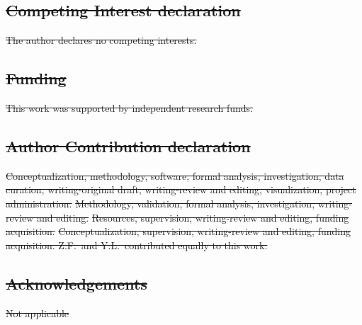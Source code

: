 \documentclass[referee, pdflatex, sn-vancouver-num]{sn-jnl}
\providecommand{\DIFdeltex}[1]{{\protect\color{red}\sout{#1}}}                      %
\providecommand{\DIFaddbegin}{} %
\providecommand{\DIFaddend}{} %
\providecommand{\DIFdelbegin}{} %
\providecommand{\DIFdelend}{} %
\providecommand{\DIFdel}[1]{\texorpdfstring{\DIFdeltex{#1}}{}} %
\newcommand{\DIFscaledelfig}{0.5}
\newlength{\DIFdelgraphicswidth} %
\newlength{\DIFdelgraphicsheight} %
\newcommand{\DIFaddincludegraphics}[2][]{{\color{blue}\fbox{\DIFOincludegraphics[#1]{#2}}}} %
\newcommand{\DIFdelincludegraphics}[2][]{%
\sbox{\DIFdelgraphicsbox}{\DIFOincludegraphics[#1]{#2}}%
\settoboxwidth{\DIFdelgraphicswidth}{\DIFdelgraphicsbox} %
\settoboxtotalheight{\DIFdelgraphicsheight}{\DIFdelgraphicsbox} %
\scalebox{\DIFscaledelfig}{%
\parbox[b]{\DIFdelgraphicswidth}{\usebox{\DIFdelgraphicsbox}\\[-\baselineskip] \rule{\DIFdelgraphicswidth}{0em}}\llap{\resizebox{\DIFdelgraphicswidth}{\DIFdelgraphicsheight}{%
\setlength{\unitlength}{\DIFdelgraphicswidth}%
\begin{picture}(1,1)%
\thicklines\linethickness{2pt} %
{\color[rgb]{1,0,0}\put(0,0){\framebox(1,1){}}}%
{\color[rgb]{1,0,0}\put(0,0){\line( 1,1){1}}}%
{\color[rgb]{1,0,0}\put(0,1){\line(1,-1){1}}}%
\end{picture}%
}\hspace*{3pt}}} %
} %
\DeclareRobustCommand{\DIFaddbegin}{\DIFOaddbegin \let\includegraphics\DIFaddincludegraphics} %
\DeclareRobustCommand{\DIFaddend}{\DIFOaddend \let\includegraphics\DIFOincludegraphics} %
\DeclareRobustCommand{\DIFdelbegin}{\DIFOdelbegin \let\includegraphics\DIFdelincludegraphics} %
\DeclareRobustCommand{\DIFdelend}{\DIFOaddend \let\includegraphics\DIFOincludegraphics} %
\begin{document}
\begin{appendices}
\subsection*{\DIFdel{Competing Interest declaration}}
\DIFdel{The author declares no competing interests.
}\DIFdelend

\DIFdelbegin \subsection*{\DIFdel{Funding}}
\DIFdel{This work was supported by independent research funds.
}\DIFdelend %


\DIFdelbegin \subsection*{\DIFdel{Author Contribution declaration}}
\DIFdel{Conceptualization, methodology, software, formal analysis, investigation, data curation, writing-original draft, writing-review and editing, visualization, project administration.
}%
\DIFdel{Methodology, validation, formal analysis, investigation, writing-review and editing.
}%
\DIFdel{Resources, supervision, writing-review and
editing, funding acquisition.
}%
\DIFdel{Conceptualization, supervision, writing-review and editing, funding acquisition.
Z.F.\ and Y.L.\ contributed equally to this work.
}\DIFdelend \DIFaddbegin \end{appendices}
\DIFaddend

\DIFdelbegin \subsection*{\DIFdel{Acknowledgements}}
\DIFdel{Not applicable
}\DIFdelend %
\end{document}
